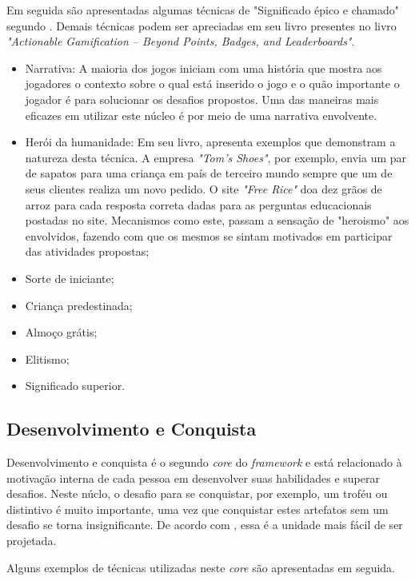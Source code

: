 Em seguida são apresentadas algumas técnicas de "Significado épico e chamado" segundo .
Demais técnicas podem ser apreciadas em seu livro presentes no livro \textit{"Actionable Gamification – Beyond Points, Badges, and Leaderboards"}.

\begin{itemize}
	\item Narrativa: A maioria dos jogos iniciam com uma história que mostra aos jogadores o contexto sobre o qual está
	inserido o jogo e o quão importante o jogador é para solucionar os desafios propostos. Uma das maneiras mais eficazes
	em utilizar este núcleo é por meio de uma narrativa envolvente. 
	\item Herói da humanidade: Em seu livro,  apresenta exemplos que demonstram a natureza desta
	técnica. A empresa \textit{"Tom's Shoes"}, por exemplo, envia um par de sapatos para uma criança em país de terceiro mundo sempre
	que um de seus clientes realiza um novo pedido. O site \textit{"Free Rice"} doa dez grãos de arroz para cada resposta correta dadas
	para as perguntas educacionais postadas no site. Mecanismos como este, passam a sensação de "heroismo" aos envolvidos, fazendo com que 
	os mesmos se sintam motivados em participar das atividades propostas;
	\item Sorte de iniciante;
	\item Criança predestinada;
	\item Almoço grátis;
	\item Elitismo;
	\item Significado superior.

\end{itemize}

\subsection{Desenvolvimento e Conquista}
Desenvolvimento e conquista é o segundo \textit{core} do \textit{framework} e está relacionado à motivação interna de 
cada pessoa em desenvolver suas habilidades e superar desafios. Neste núclo, o desafio para se conquistar, por exemplo, 
um troféu ou distintivo é muito importante, uma vez que conquistar estes artefatos sem um desafio se torna insignificante.
De acordo com , essa é a unidade mais fácil de ser projetada. 

Alguns exemplos de técnicas utilizadas neste \textit{core} são apresentadas em seguida.

